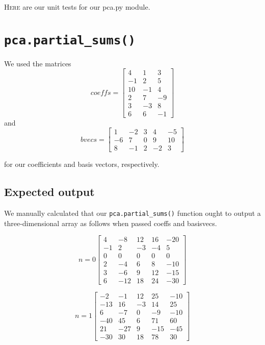 \documentclass{article}
\begin{document}
\textsc{Here} are our unit tests for our pca.py module.
\section{\texttt{pca.partial\_sums()}}
\label{sec:partialsums}

We used the matrices
\[coeffs = \left[ \begin{array}{ccc}
4 & 1 & 3 \\
-1 & 2 & 5 \\
10 & -1 & 4 \\
2 & 7 & -9 \\
3 & -3 & 8 \\
6 & 6 & -1
\end{array} \right] \]
and
\[bvecs = \left[ \begin{array}{ccccc}
1 & -2 & 3 & 4 & -5 \\
-6 & 7 & 0 & 9 & 10 \\
8 & -1 & 2 & -2 & 3
\end{array} \right] \]

for our coefficients and basis vectors, respectively.

\subsection{Expected output}
\label{sec:manual}

We manually calculated that our \verb|pca.partial_sums()| function
ought to output a three-dimensional array as follows when passed
coeffs and basisvecs.

\[n=0 \left[ \begin{array}{ccccc}
4 & -8 & 12 & 16 & -20 \\
-1 & 2 & -3 & -4 & 5 \\
0 & 0 & 0 & 0 & 0 \\
2 & -4 & 6 & 8 & -10 \\
3 & -6 & 9 & 12 & -15 \\
6 & -12 & 18 & 24 & -30
\end{array} \right] \]

\[n=1 \left[ \begin{array}{ccccc}
-2 & -1 & 12 & 25 & -10 \\
-13 & 16 & -3 & 14 & 25 \\
6 & -7 & 0 & -9 & -10 \\
-40 & 45 & 6 & 71 & 60 \\
21 & -27 & 9 & -15 & -45 \\
-30 & 30 & 18 & 78 & 30
\end{array} \right] \]
\end{document}

